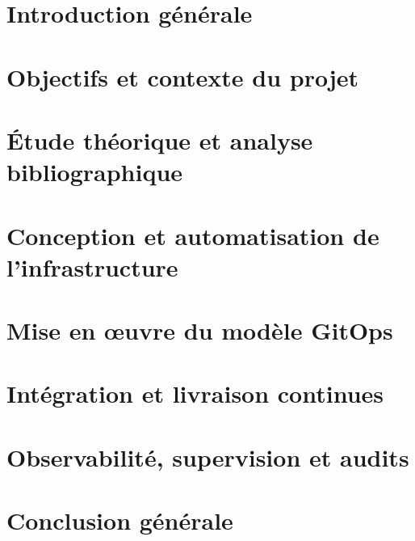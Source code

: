 \chapter{Introduction générale}


\chapter{Objectifs et contexte du projet}\label{chapter:objectifs_contexte}


\chapter{Étude théorique et analyse bibliographique}\label{chapter:etude_theorique}


\chapter{Conception et automatisation de l’infrastructure}\label{chapter:iac}


\chapter{Mise en œuvre du modèle GitOps}\label{chapter:gitops}


\chapter{Intégration et livraison continues}\label{chapter:cicd}


\chapter{Observabilité, supervision et audits}\label{chapter:observabilite_auditing}



\chapter*{Conclusion générale}

